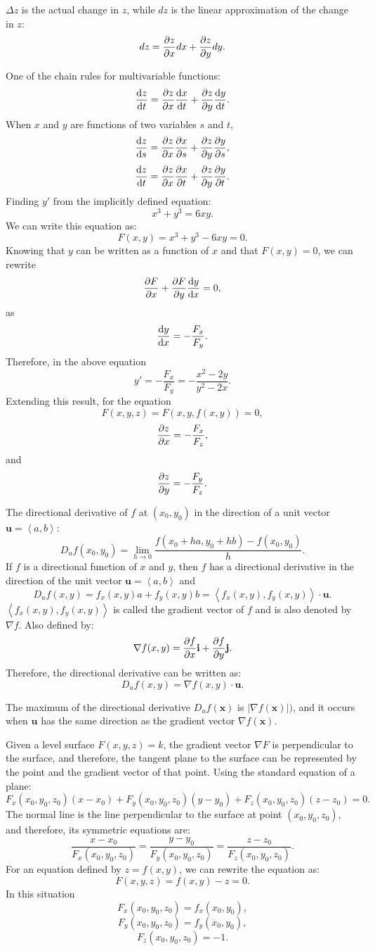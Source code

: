 \documentclass{article}
\begin{document}
$\Delta z$ is the 
actual change in $z$, while $dz$ is the linear approximation of the change in $z$:
\[dz = \pdv{z}{x}dx + \pdv{z}{y}dy.\]

One of the chain rules for multivariable functions:
\[\dv{z}{t} = \pdv{z}{x}\dv{x}{t} + \pdv{z}{y}\dv{y}{t}.\]
When $x$ and $y$ are functions of two variables $s$ and $t$, 
\[\dv{z}{s} = \pdv{z}{x}\pdv{x}{s} + \pdv{z}{y}\pdv{y}{s},\]
\[\dv{z}{t} = \pdv{z}{x}\pdv{x}{t} + \pdv{z}{y}\pdv{y}{t}.\]
Finding $y'$ from the implicitly defined equation:
\[x^3 + y^3 = 6xy.\]
We can write this equation as:
\[F(x,y) = x^3 + y^3 - 6xy = 0.\]
Knowing that $y$ can be written as a function of $x$ and that 
$F(x,y) = 0$, we can rewrite 
\[\pdv{F}{x} + \pdv{F}{y}\dv{y}{x} = 0,\]
as \[\dv{y}{x} = -\frac{F_x}{F_y}.\]
Therefore, in the above equation 
\[y' = -\frac{F_x}{F_y} = -\frac{x^2 - 2y}{y^2 -2x}.\]
Extending this result, for the equation
\[F(x,y,z)=F(x,y,f(x,y))=0,\]
\[\pdv{z}{x} = -\frac{F_x}{F_z},\] and
\[\pdv{z}{y} = -\frac{F_y}{F_z}.\]

The directional derivative of $f$ at $(x_0, y_0)$ in the direction
of a unit vector $\mathbf{u} = \left\langle a,b \right\rangle$:
\[D_uf(x_0,y_0) = \lim_{h \to 0}\frac{f(x_0 + ha, y_0 + hb) - f(x_0,y_0)}{h}.\]
If $f$ is a directional function of $x$ and $y$, then $f$ has a directional
derivative in the direction of the unit vector $\mathbf{u} = \left\langle a,b \right\rangle$
and \[D_uf(x,y) = f_x(x,y)a + f_y(x,y)b
= \left\langle f_x(x,y),f_y(x,y) \right\rangle \cdot \mathbf{u}
.\]
$\left\langle f_x(x,y),f_y(x,y) \right\rangle$ is called the gradient vector of
$f$ and is also denoted by $\nabla f$. Also defined by:
\[\nabla f(x,y) = \pdv{f}{x}\mathbf{i} + \pdv{f}{y}\mathbf{j}.\]
Therefore, the directional derivative can be written as:
\[D_uf(x,y)=\nabla f(x,y) \cdot \mathbf{u}.\]

The maximum of the directional derivative 
$D_uf(\mathbf{x})$ is $|\nabla f(\mathbf{x})|)$, and it occurs when
$\mathbf{u}$ has the same direction as the gradient vector $\nabla f(\mathbf{x})$.

Given a level surface $F(x,y,z) = k$, the gradient vector $\nabla F$
is perpendicular to the surface, and therefore, the tangent plane to the surface
can be represented by the point and the gradient vector of that point.
Using the standard equation of a plane:
\[F_x(x_0,y_0,z_0)(x-x_0)+F_y(x_0,y_0,z_0)(y-y_0)+F_z(x_0,y_0,z_0)(z-z_0)=0.\]
The normal line is the line perpendicular to the surface at point $(x_0,y_0,z_0)$,
and therefore, its symmetric equations are:
\[\frac{x-x_0}{F_x(x_0,y_0,z_0)} = \frac{y-y_0}{F_y(x_0,y_0,z_0)}
 = \frac{z-z_0}{F_z(x_0,y_0,z_0)}.\]
For an equation defined by $z=f(x,y)$, we can rewrite the equation as:
\[F(x,y,z) = f(x,y) - z = 0.\] In this situation
\[F_x(x_0,y_0,z_0) = f_x(x_0,y_0),\]
\[F_y(x_0,y_0,z_0) = f_y(x_0,y_0),\]
\[F_z(x_0,y_0,z_0) = -1.\]
\end{document}
